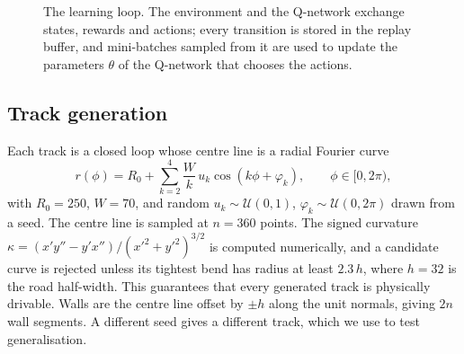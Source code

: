 \documentclass[11pt,a4paper]{article}
\begin{document}
\begin{figure}[H]
\centering
{}
\caption{The learning loop. The environment and the Q-network exchange states, rewards and actions; every transition is stored in the replay buffer, and mini-batches sampled from it are used to update the parameters \(\theta\) of the Q-network that chooses the actions.}
\label{fig:loop}
\end{figure}

\subsection{Track generation}
Each track is a closed loop whose centre line is a radial Fourier curve
\begin{equation}
  r(\phi)=R_0+\sum_{k=2}^{4}\frac{W}{k}\,u_k\cos(k\phi+\varphi_k),\qquad \phi\in[0,2\pi),
\end{equation}
with \(R_0=250\), \(W=70\), and random \(u_k\sim\mathcal U(0,1)\), \(\varphi_k\sim\mathcal U(0,2\pi)\) drawn from a seed.
The centre line is sampled at \(n=360\) points.
The signed curvature
\(\kappa=(x'y''-y'x'')/(x'^2+y'^2)^{3/2}\) is computed numerically, and a candidate curve is rejected unless its tightest bend has radius at least \(2.3\,h\), where \(h=32\) is the road half-width.
This guarantees that every generated track is physically drivable.
Walls are the centre line offset by \(\pm h\) along the unit normals, giving \(2n\) wall segments.
A different seed gives a different track, which we use to test generalisation.
\end{document}
